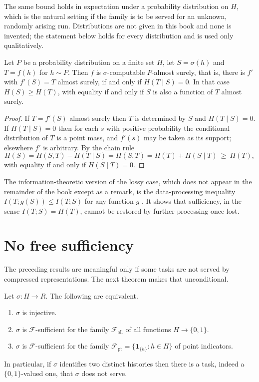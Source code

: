 The same bound holds in expectation under a probability distribution on $H$, which is the natural setting if the family is to be served for an unknown, randomly arising run. Distributions are not given in this book and none is invented; the statement below holds for every distribution and is used only qualitatively.

\begin{theorem}
\label{thm:entropy}
Let $P$ be a probability distribution on a finite set $H$, let $S=\sigma(h)$ and $T=f(h)$ for $h\sim P$. Then $f$ is $\sigma$-computable $P$-almost surely, that is, there is $f'$ with $f'(S)=T$ almost surely, if and only if $H(T\mid S)=0$. In that case $H(S)\ge H(T)$, with equality if and only if $S$ is also a function of $T$ almost surely.
\end{theorem}

\begin{proof}
If $T=f'(S)$ almost surely then $T$ is determined by $S$ and $H(T\mid S)=0$. If $H(T\mid S)=0$ then for each $s$ with positive probability the conditional distribution of $T$ is a point mass, and $f'(s)$ may be taken as its support; elsewhere $f'$ is arbitrary. By the chain rule
\[
H(S)=H(S,T)-H(T\mid S)=H(S,T)=H(T)+H(S\mid T)\ \ge\ H(T),
\]
with equality if and only if $H(S\mid T)=0$.
\end{proof}

The information-theoretic version of the lossy case, which does not appear in the remainder of the book except as a remark, is the data-processing inequality $I(T;g(S))\le I(T;S)$ for any function $g$ . It shows that sufficiency, in the sense $I(T;S)=H(T)$, cannot be restored by further processing once lost.

\section{No free sufficiency}

The preceding results are meaningful only if some tasks are not served by compressed representations. The next theorem makes that unconditional.

\begin{theorem}
\label{thm:nofree}
Let $\sigma:H\to R$. The following are equivalent.
\begin{enumerate}[label=(\roman*),nosep]
\item $\sigma$ is injective.
\item $\sigma$ is $\mathcal F$-sufficient for the family $\mathcal F_{\mathrm{all}}$ of all functions $H\to\{0,1\}$.
\item $\sigma$ is $\mathcal F$-sufficient for the family $\mathcal F_{\mathrm{pt}}=\{\mathbf 1_{\{h\}}:h\in H\}$ of point indicators.
\end{enumerate}
In particular, if $\sigma$ identifies two distinct histories then there is a task, indeed a $\{0,1\}$-valued one, that $\sigma$ does not serve.
\end{theorem}

